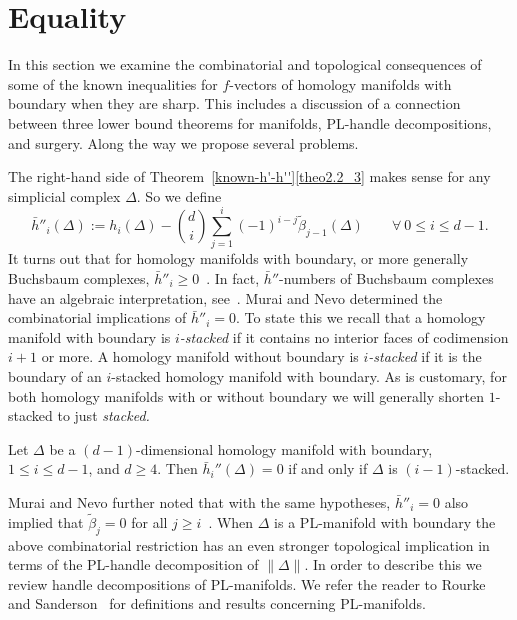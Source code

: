 \documentclass[ALCO,ThmDefs,Unicode,epreuves]{cedram}
\begin{document}
%
\section{Equality}
 In this section we examine the combinatorial and topological consequences of some of the known inequalities for $f$-vectors of homology manifolds with boundary when they are sharp. This includes a discussion of a connection between three lower bound theorems for manifolds, PL-handle decompositions, and surgery. Along the way we propose several problems. 
 
	The right-hand side of Theorem~\ref{known-h'-h''}\eqref{theo2.2_3} makes sense for any simplicial complex $\Delta.$ So we define
\[
\bar{h}''_i(\Delta):= h_i(\Delta)-\binom{d}{i}\sum_{j=1}^{i}(-1)^{i-j}\tilde{\beta}_{j-1}(\Delta) \qquad \forall ~0\leq i\leq d-1.
\]
It turns out that for homology manifolds with boundary, or more generally Buchsbaum complexes, $\bar{h}''_i \ge 0$~\cite[Section~3]{Novik-Swartz-09:Socles}. In fact, $\bar{h}''$-numbers of Buchsbaum complexes have an algebraic interpretation, see~\cite[Theorem~1.2]{Murai-Novik-Yoshida}. Murai and Nevo determined the combinatorial implications of $\bar{h}''_i=0.$ To state this we recall that a homology manifold with boundary is \emph{$i$-stacked} if it contains no interior faces of codimension $i+1$ or more. A homology manifold without boundary is \emph{$i$-stacked} if it is the boundary of an $i$-stacked homology manifold with boundary. As is customary, for both homology manifolds with or without boundary we will generally shorten $1$-stacked to just \emph{stacked.} 

 

\begin{theorem} \label{h''=0} 
Let $\Delta$ be a $(d-1)$-dimensional homology manifold with boundary, $1 \le i \le d-1$, and $d \ge4.$ Then $\bar{h}_i''(\Delta)=0$ if and only if $\Delta$ is $(i-1)$-stacked.
\end{theorem}

 Murai and Nevo further noted that with the same hypotheses, $\bar{h}''_i=0$ also implied that $\tilde{\beta}_j = 0$ for all $j \ge i$~\cite[Corollary~3.2]{Murai-Nevo-14}. When $\Delta$ is a PL-manifold with boundary the above combinatorial restriction has an even stronger topological implication in terms of the PL-handle decomposition of $\|\Delta\|.$ In order to describe this we review handle decompositions of PL-manifolds. We refer the reader to Rourke and Sanderson~\cite{Rourke-Sanderson} for definitions and results concerning PL-manifolds. 
\end{document}
